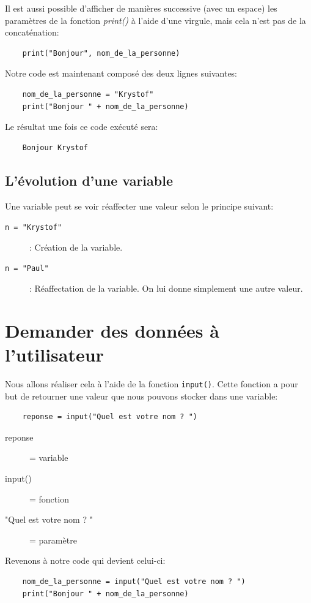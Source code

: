 \documentclass[a4paper,11pt]{book}
\begin{document}
Il est aussi possible d'afficher de manières successive (avec un espace) les paramètres de la fonction \textit{print()} à l'aide d'une virgule, mais cela n'est pas de la concaténation:
\begin{verbatim}
    print("Bonjour", nom_de_la_personne)
\end{verbatim}
\medskip

Notre code est maintenant composé des deux lignes suivantes:
\begin{lstlisting}
	nom_de_la_personne = "Krystof"
	print("Bonjour " + nom_de_la_personne)
\end{lstlisting}
\medskip

Le résultat une fois ce code exécuté sera:
\begin{verbatim}
    Bonjour Krystof
\end{verbatim}
\medskip

\subsection*{L'évolution d'une variable}
Une variable peut se voir réaffecter une valeur selon le principe suivant:
\begin{description}
	\item[\texttt{n = "Krystof"}]: Création de la variable.
	\item[\texttt{n = "Paul"}]: Réaffectation de la variable. On lui donne simplement une autre valeur.
\end{description}
\medskip

\section{Demander des données à l'utilisateur}
Nous allons réaliser cela à l'aide de la fonction \texttt{input()}. Cette fonction a pour but de retourner une valeur que nous pouvons stocker dans une variable:
\begin{verbatim}
    reponse = input("Quel est votre nom ? ")
\end{verbatim}
\begin{description}
    \item[reponse] = variable
    \item[input()] = fonction
    \item["Quel est votre nom ? "] = paramètre
\end{description}
\medskip

Revenons à notre code qui devient celui-ci:
\begin{lstlisting}
    nom_de_la_personne = input("Quel est votre nom ? ")
    print("Bonjour " + nom_de_la_personne)
\end{lstlisting}
\medskip
\end{document}
